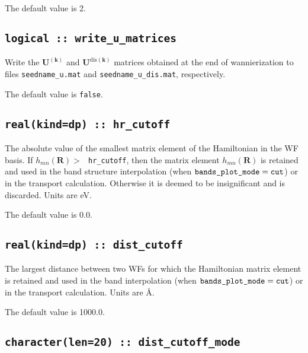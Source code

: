 The default value is 2.


\subsection[write\_u\_matrices]{\tt logical :: write\_u\_matrices}

Write the $\mathbf{U}^{(\mathbf{k})}$ and $\mathbf{U}^{\mathrm{dis}(\mathbf{k})}$ matrices obtained at the end of wannierization to files
{\tt seedname\_u.mat} and {\tt seedname\_u\_dis.mat}, respectively.

The default value is {\tt false}.


\subsection[hr\_cutoff]{\tt real(kind=dp) :: hr\_cutoff}

The absolute value of the smallest matrix element of the
Hamiltonian in the WF basis.
If $h_{mn}(\mathbf{R})>\:${\tt
  hr\_cutoff}, then the matrix element
$h_{mn}(\mathbf{R})$ is retained and used in
the band structure interpolation (when $\verb#bands_plot_mode#=\verb#cut#$)
or in the transport calculation.
Otherwise it is deemed to be insignificant
and is discarded. Units are eV.


The default value is 0.0.

\subsection[dist\_cutoff]{\tt real(kind=dp) :: dist\_cutoff}

The largest distance between two WFs for which
the Hamiltonian matrix element is retained and used in
the band interpolation (when $\verb#bands_plot_mode#=\verb#cut#$)
or in the transport calculation. Units are \AA.

The default value is 1000.0.

\subsection[dist\_cutoff\_mode]{\tt character(len=20) :: dist\_cutoff\_mode}

